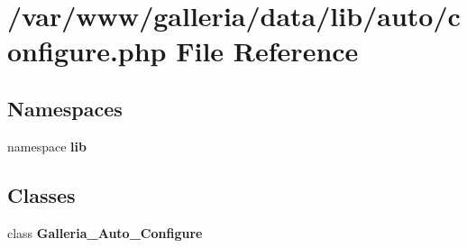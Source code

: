 \section{/var/www/galleria/data/lib/auto/configure.php File Reference}
\label{configure_8php}
\subsection*{Namespaces}
\begin{CompactItemize}
\item 
namespace {\bf lib}
\end{CompactItemize}
\subsection*{Classes}
\begin{CompactItemize}
\item 
class {\bf Galleria\_\-Auto\_\-Configure}
\end{CompactItemize}
